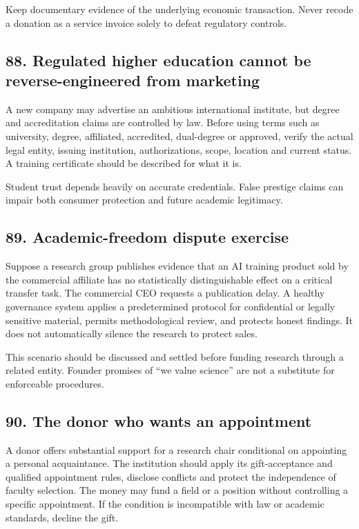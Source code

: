 Keep documentary evidence of the underlying economic transaction. Never recode a donation as a service invoice solely to defeat regulatory controls.

\subsection{88. Regulated higher education cannot be reverse-engineered from marketing}

A new company may advertise an ambitious international institute, but degree and accreditation claims are controlled by law. Before using terms such as university, degree, affiliated, accredited, dual-degree or approved, verify the actual legal entity, issuing institution, authorizations, scope, location and current status. A training certificate should be described for what it is.

Student trust depends heavily on accurate credentials. False prestige claims can impair both consumer protection and future academic legitimacy.

\subsection{89. Academic-freedom dispute exercise}

Suppose a research group publishes evidence that an AI training product sold by the commercial affiliate has no statistically distinguishable effect on a critical transfer task. The commercial CEO requests a publication delay. A healthy governance system applies a predetermined protocol for confidential or legally sensitive material, permits methodological review, and protects honest findings. It does not automatically silence the research to protect sales.

This scenario should be discussed and settled before funding research through a related entity. Founder promises of ``we value science'' are not a substitute for enforceable procedures.

\subsection{90. The donor who wants an appointment}

A donor offers substantial support for a research chair conditional on appointing a personal acquaintance. The institution should apply its gift-acceptance and qualified appointment rules, disclose conflicts and protect the independence of faculty selection. The money may fund a field or a position without controlling a specific appointment. If the condition is incompatible with law or academic standards, decline the gift.

